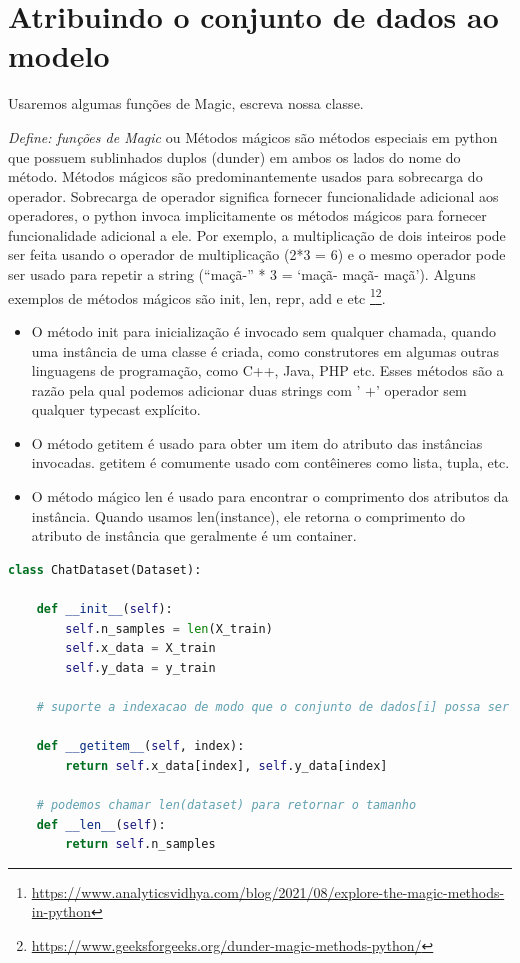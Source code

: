 \section[Atribuindo o conjunto de dados ao modelo]{Atribuindo o conjunto de dados ao modelo}

Usaremos algumas funções de Magic, escreva nossa classe.

\textit{Define: funções de Magic} ou Métodos mágicos são métodos especiais em python que possuem sublinhados duplos (dunder) em ambos os lados do nome do método. Métodos mágicos são predominantemente usados para sobrecarga do operador. Sobrecarga de operador significa fornecer funcionalidade adicional aos operadores, o python invoca implicitamente os métodos mágicos para fornecer funcionalidade adicional a ele. Por exemplo, a multiplicação de dois inteiros pode ser feita usando o operador de multiplicação (2*3 = 6) e o mesmo operador pode ser usado para repetir a string (“maçã-” * 3 = ‘maçã- maçã- maçã’).
Alguns exemplos de métodos mágicos são init, len, repr, add e etc \footnote{\url{https://www.analyticsvidhya.com/blog/2021/08/explore-the-magic-methods-in-python}}\footnote{\url{https://www.geeksforgeeks.org/dunder-magic-methods-python/}}.


\begin{itemize}
   \item O método init para inicialização é invocado sem qualquer chamada, quando uma instância de uma classe é criada, como construtores em algumas outras linguagens de programação, como C++, Java, PHP etc. Esses métodos são a razão pela qual podemos adicionar duas strings com ' +' operador sem qualquer typecast explícito.
   \item O método getitem é usado para obter um item do atributo das instâncias invocadas. getitem é comumente usado com contêineres como lista, tupla, etc.
   \item O método mágico len é usado para encontrar o comprimento dos atributos da instância. Quando usamos len(instance), ele retorna o comprimento do atributo de instância que geralmente é um container.
\end{itemize}

\begin{lstlisting}[language=Python, caption=Dataset]
class ChatDataset(Dataset):

    def __init__(self):
        self.n_samples = len(X_train)
        self.x_data = X_train
        self.y_data = y_train

    # suporte a indexacao de modo que o conjunto de dados[i] possa ser usado para obter a i-esima amostra

    def __getitem__(self, index):
        return self.x_data[index], self.y_data[index]

    # podemos chamar len(dataset) para retornar o tamanho
    def __len__(self):
        return self.n_samples

\end{lstlisting}


